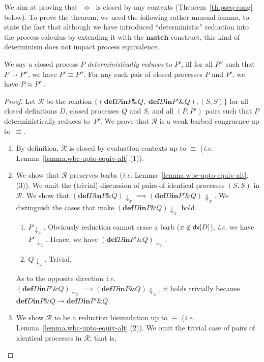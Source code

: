 \documentclass{LMCS}
\makeatletter
\newcommand{\ie}{\emph{i.e.}\@\xspace}
\newcommand{\kwd}[1]{\ensuremath{\mathbf{#1}}}
\newcommand{\prefix}[1]{\mathopen{}\mathrel{\kwd {#1}}}
\newcommand{\infix}[1]{\mathrel{\kwd {#1}}}
\newcommand{\set}[1]{\{#1\}}
\renewcommand{\_}{\mathord{\rule[-.25ex]{1ex}{.15ex}}}
\newcommand{\para}[2]{#1\mathop{\&}#2}
\newcommand{\define}[2]{\prefix{def} #1 \infix{in} #2}
\newcommand{\reduces}{\longrightarrow}
\newcommand{\wbc}{\mathrel{\approx}}
\newcommand{\R}{\mathrel{\mathcal{R}}}
\newcommand{\pseq}{\;\mathop{\Bumpeq}\;}
\newcommand{\weakbarb}[2]{#1\!\Downarrow_{#2}}
\newcommand{\barb}[2]{#1\!\downarrow_{#2}}
\newcommand{\dv}[1]{\mbox{\sf dv}[#1]}
\makeatother
\begin{document}
We aim at proving that $\pseq$ is closed by any contexts
(Theorem~\ref{th.pseq-cong} below). To prove the theorem, we need the
following rather unusual lemma, to state the fact that although we
have introduced ``deterministic'' reduction into the process calculus
by extending it with the \kwd{match} construct, this kind of
determinism does not impact process equivalence.
\begin{lem}\label{lemma.joinpi.reduces}
  We say a closed process $P$ \emph{deterministically reduces} to $P'$,
  iff for all $P''$ such that $P\reduces P''$, we have $P'\equiv P''$.
  For any such pair of closed processes $P$ and $P'$, we have $P \wbc
  P'$ .
\end{lem}
\begin{proof}
  Let $\R$ be the relation $\set{(\define{D}{\para{P}{Q}},
  \;\define{D}{\para{P'}{Q}}), (S,S)}$ for all closed definitions
  $D$, closed processes $Q$ and $S$, and all $(P, P')$ pairs such
  that $P$ deterministically reduces to~$P'$. We prove that $\R$
  is a weak barbed congruence up to~$\equiv$.
  \begin{enumerate}[$\bullet$]
  \item By definition, $\R$ is closed by evaluation contexts
    up to $\equiv$ (\ie Lemma~\ref{lemma.wbc-upto-equiv-alt}.(1)).
  \item We show that $\R$ preserves barbs (\ie
    Lemma~\ref{lemma.wbc-upto-equiv-alt}.(3)). We omit the (trivial) discussion
    of pairs of identical processes $(S,S)$ in $\R$.
    We show that $\barb{(\define{D}{\para{P}{Q}})}{x} \implies
    \weakbarb{(\define{D}{\para{P'}{Q}})}{x}$. We distinguish the
    cases that make $\barb{(\define{D}{\para{P}{Q}})}{x}$ hold.
    \begin{enumerate}[$-$]
    \item $\barb{P}{x}$.
      Obviously reduction cannot erase a barb  ($x\not\in\dv{D}$), \ie
      we have $\barb{P'}{x}$.
      Hence, we have $\barb{(\define{D}{\para{P'}{Q}})}{x}$.
    \item $\barb{Q}{x}$. Trivial.
    \end{enumerate}
    As to the opposite direction \ie
    $\barb{(\define{D}{\para{P'}{Q}})}{x} \implies
    \weakbarb{(\define{D}{\para{P}{Q}})}{x}$, it holds trivially
    because $\define{D}{\para{P}{Q}} \reduces
    \define{D}{\para{P'}{Q}}$.
  \item We show $\R$ to be a reduction bisimulation up to $\equiv$
    (\ie Lemma~\ref{lemma.wbc-upto-equiv-alt}.(2)). We omit the
    trivial case of pairs of identical processes in $\R$, that is,

\end{enumerate}
\end{proof}
\end{document}
